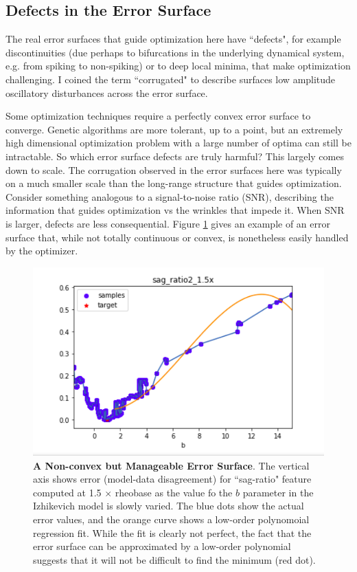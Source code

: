 \subsection{Defects in the Error Surface}
The real error surfaces that guide optimization here have ``defects", for example discontinuities (due perhaps to bifurcations in the underlying dynamical system, e.g. from spiking to non-spiking) or to deep local minima, that make optimization challenging.
I coined the term ``corrugated" to describe surfaces low amplitude oscillatory disturbances across the error surface.

Some optimization techniques require a perfectly convex error surface to converge.
Genetic algorithms are more tolerant, up to a point, but an extremely high dimensional optimization problem with a large number of optima can still be intractable.
So which error surface defects are truly harmful?
This largely comes down to scale.
The corrugation observed in the error surfaces here was typically on a much smaller scale than the long-range structure that guides optimization.
Consider something analogous to a signal-to-noise ratio (SNR), describing the information that guides optimization vs the wrinkles that impede it.
When SNR is larger, defects are less consequential.
Figure \ref{fig:easy-case} gives an example of an error surface that, while not totally continuous or convex, is nonetheless easily handled by the optimizer.

\begin{figure}      
\centering
      \includegraphics[scale=0.85]{figures/parameter_b_friendly_surface.png}
      \caption[A Non-convex but Manageable Error Surface]{\textbf{A Non-convex but Manageable Error Surface}.
      The vertical axis shows error (model-data disagreement) for ``sag-ratio" feature computed at 1.5 $\times$ rheobase as the value fo the $b$ parameter in the Izhikevich model is slowly varied.
      The blue dots show the actual error values, and the orange curve shows a low-order polynomoial regression fit.
      While the fit is clearly not perfect, the fact that the error surface can be approximated by a low-order polynomial suggests that it will not be difficult to find the minimum (red dot).}
      \label{fig:easy-case}
\end{figure}

